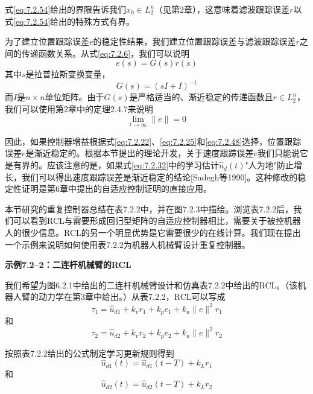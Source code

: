 \documentclass[UTF8]{ctexart}
\begin{document}
式\eqref{eq:7.2.54}给出的界限告诉我们$x_0 \in L_2^n$（见第2章），这意味着滤波跟踪误差$r$以式\eqref{eq:7.2.54}给出的特殊方式有界。

为了建立位置跟踪误差$e$的稳定性结果，我们建立位置跟踪误差与滤波跟踪误差$r$之间的传递函数关系。从式\eqref{eq:7.2.6}，我们可以说明
\begin{equation}\label{eq:7.2.55}
e(s) = G(s)r(s)
\end{equation}
其中$s$是拉普拉斯变换变量，
\begin{equation}\label{eq:7.2.56}
G(s) = (sI + I)^{-1}
\end{equation}
而$I$是$n \times n$单位矩阵。由于$G(s)$是严格适当的、渐近稳定的传递函数且$r \in L_2^n$，我们可以使用第2章中的定理2.4.7来说明
\begin{equation}\label{eq:7.2.57}
\lim_{t \to \infty} \|e\| = 0
\end{equation}

因此，如果控制器增益根据式\eqref{eq:7.2.22}、\eqref{eq:7.2.25}和\eqref{eq:7.2.48}选择，位置跟踪误差$e$是渐近稳定的。根据本节提出的理论开发，关于速度跟踪误差$\dot{e}$我们只能说它是有界的。应该注意的是，如果式\eqref{eq:7.2.32}中的学习估计$\hat{u}_d(t)$"人为地"防止增长，我们可以得出速度跟踪误差是渐近稳定的结论[Sadegh等1990]。这种修改的稳定性证明是第6章中提出的自适应控制证明的直接应用。

本节研究的重复控制器总结在表7.2.2中，并在图7.2.3中描绘。浏览表7.2.2后，我们可以看到RCL与需要形成回归型矩阵的自适应控制器相比，需要关于被控机器人的很少信息。RCL的另一个明显优势是它需要很少的在线计算。我们现在提出一个示例来说明如何使用表7.2.2为机器人机械臂设计重复控制器。

\textbf{示例7.2--2：二连杆机械臂的RCL}

我们希望为图6.2.1中给出的二连杆机械臂设计和仿真表7.2.2中给出的RCL。（该机器人臂的动力学在第3章中给出。）从表7.2.2，RCL可以写成
\begin{equation}
\tau_1 = \hat{u}_{d1} + k_v r_1 + k_p e_1 + k_a\|e\|^2r_1
\end{equation}
和
\begin{equation}
\tau_2 = \hat{u}_{d2} + k_v r_2 + k_p e_2 + k_a\|e\|^2r_2
\end{equation}

按照表7.2.2给出的公式制定学习更新规则得到
\begin{equation}
\hat{u}_{d1}(t) = \hat{u}_{d1}(t-T) + k_L r_1
\end{equation}
和
\begin{equation}
\hat{u}_{d2}(t) = \hat{u}_{d2}(t-T) + k_L r_2
\end{equation}
\end{document}
